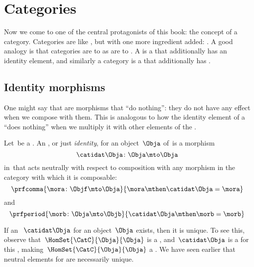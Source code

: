 \section{Categories}

Now we come to one of the central protagonists of this book: the concept of a category.
Categories are like , but with one more ingredient added: .
A good analogy is that categories are to  as  are to .
A  is a  that additionally has an identity element, and similarly a category is a  that additionally has .

\subsection{Identity morphisms}

One might say that  are morphisms that ``do nothing'': they do not have any effect when we compose with them.
This is analogous to how the identity element of a  ``does nothing'' when we multiply it with other elements of the .

\begin{ctdefinition}
    \label{def:identity-morphism}
    Let~\CatC be a .
    An , or just \emph{identity}, for an object~$\Obja$ of~\CatC is a morphism
    \begin{equation}
        \catidat\Obja \colon \Obja \mto \Obja
    \end{equation}
    in~\CatC that acts neutrally with respect to composition with any morphism in the category with which it is composable:
    \begin{equation}\label{eq:identities-unitality-1}
        \prfcomma{
            \mora \colon \Objf \mto \Obja
        }{
            \mora \mthen \catidat\Obja = \mora
        }
    \end{equation}
    and
    \begin{equation}\label{eq:identities-unitality-2}
        \prfperiod{
            \morb \colon \Obja \mto \Objb
        }{
            \catidat\Obja \mthen \morb = \morb
        }
    \end{equation}
\end{ctdefinition}

\begin{remark}
    If an ~$\catidat\Obja$ for an object~$\Obja$ exists, then it is unique.
    To see this, observe that~$\HomSet{\CatC}{\Obja}{\Obja}$ is a , and~$\catidat\Obja$ is a  for this , making~$\HomSet{\CatC}{\Obja}{\Obja}$ a .
    We have seen earlier that neutral elements for  are necessarily unique.
\end{remark}


